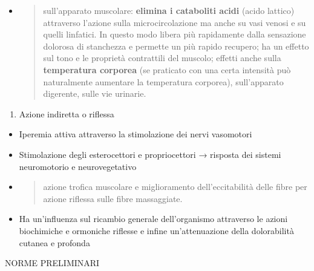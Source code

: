 \documentclass[]{article}
\begin{document}
\begin{itemize}
\begin{quote}
  \end{quote}
\item
  \begin{quote}
  sull'apparato muscolare: \textbf{elimina i cataboliti acidi} (acido
  lattico) attraverso l'azione sulla microcircolazione ma anche su vasi
  venosi e su quelli linfatici. In questo modo libera più rapidamente
  dalla sensazione dolorosa di stanchezza e permette un più rapido
  recupero; ha un effetto sul tono e le proprietà contrattili del
  muscolo; effetti anche sulla \textbf{temperatura corporea} (se
  praticato con una certa intensità può naturalmente aumentare la
  temperatura corporea), sull'apparato digerente, sulle vie urinarie.
  \end{quote}
\end{itemize}

\begin{enumerate}
\def\labelenumi{\arabic{enumi}.}
\item
  Azione indiretta o riflessa
\end{enumerate}

\begin{itemize}
\item
  Iperemia attiva attraverso la stimolazione dei nervi vasomotori
\item
  Stimolazione degli esterocettori e propriocettori → risposta dei
  sistemi neuromotorio e neurovegetativo
\end{itemize}

\begin{itemize}
\item
  \begin{quote}
  azione trofica muscolare e miglioramento dell'eccitabilità delle fibre
  per azione riflessa sulle fibre massaggiate.
  \end{quote}
\end{itemize}

\begin{itemize}
\item
  Ha un'influenza sul ricambio generale dell'organismo attraverso le
  azioni biochimiche e ormoniche riflesse e infine un'attenuazione della
  dolorabilità cutanea e profonda
\end{itemize}

NORME PRELIMINARI
\end{document}
